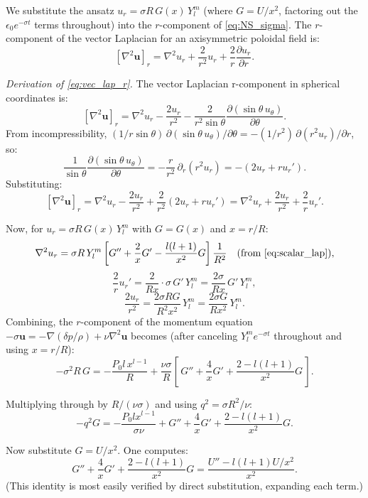 \documentclass[12pt]{article}
\newcommand{\bu}{\bm{u}}
\theoremstyle{definition}
\begin{document}
\begin{derivbox}
We substitute the ansatz $u_r = \sigma R\,G(x)\,Y_l^m$ (where $G = U/x^2$, factoring out
the $\epsilon_0 e^{-\sigma t}$ terms throughout) into the $r$-component of
\eqref{eq:NS_sigma}. The $r$-component of the vector Laplacian for an axisymmetric
poloidal field is:
\begin{equation}
  \left[\nabla^2\bu\right]_r = \nabla^2 u_r + \frac{2}{r^2}u_r + \frac{2}{r}\frac{\partial u_r}{\partial r}.
  \label{eq:vec_lap_r}
\end{equation}

\textit{Derivation of \eqref{eq:vec_lap_r}.}
The vector Laplacian r-component in spherical coordinates is:
\[
  \left[\nabla^2\bu\right]_r = \nabla^2 u_r - \frac{2u_r}{r^2}
    - \frac{2}{r^2\sin\theta}\frac{\partial(\sin\theta\,u_\theta)}{\partial\theta}.
\]
From incompressibility, $(1/r\sin\theta)\,\partial(\sin\theta\,u_\theta)/\partial\theta
= -(1/r^2)\,\partial(r^2 u_r)/\partial r$, so:
\[
  \frac{1}{\sin\theta}\frac{\partial(\sin\theta\,u_\theta)}{\partial\theta}
  = -\frac{r}{r^2}\,\partial_r(r^2 u_r)
  = -(2u_r + r u_r').
\]
Substituting:
\[
  \left[\nabla^2\bu\right]_r 
  = \nabla^2 u_r - \frac{2u_r}{r^2} 
    + \frac{2}{r^2}(2u_r + r u_r')
  = \nabla^2 u_r + \frac{2u_r}{r^2} + \frac{2}{r}u_r'.
\]

Now, for $u_r = \sigma R\,G(x)\,Y_l^m$ with $G = G(x)$ and $x=r/R$:
\[
  \nabla^2 u_r = \sigma R\,Y_l^m\left[G'' + \frac{2}{x}G' - \frac{l(l+1)}{x^2}G\right]\frac{1}{R^2}
\quad\text{(from \eqref{eq:scalar_lap})},
\]
\[
  \frac{2}{r}u_r' = \frac{2}{Rx}\cdot \sigma\,G'\,Y_l^m
  = \frac{2\sigma}{R x}\,G'\,Y_l^m,
\]
\[
  \frac{2u_r}{r^2} = \frac{2\sigma R G}{R^2 x^2}\,Y_l^m = \frac{2\sigma G}{R x^2}\,Y_l^m.
\]
Combining, the $r$-component of the momentum equation $-\sigma\bu = -\nabla(\delta p/\rho) + \nu\nabla^2\bu$ becomes (after canceling $Y_l^m e^{-\sigma t}$ throughout and using $x = r/R$):
\begin{equation}
  -\sigma^2 R\,G = -\frac{P_0 l\,x^{l-1}}{R} + \frac{\nu\sigma}{R}\left[\,G'' + \frac{4}{x}G' + \frac{2 - l(l+1)}{x^2}G\,\right].
  \label{eq:r_comp_mom}
\end{equation}

Multiplying through by $R/(\nu\sigma)$ and using $q^2 = \sigma R^2/\nu$:
\[
  -q^2 G = -\frac{P_0 l x^{l-1}}{\sigma\nu} + G'' + \frac{4}{x}G' + \frac{2-l(l+1)}{x^2}G.
\]

Now substitute $G = U/x^2$. One computes:
\[
  G'' + \frac{4}{x}G' + \frac{2-l(l+1)}{x^2}G 
  = \frac{U'' - l(l+1)U/x^2}{x^2}.
\]
(This identity is most easily verified by direct substitution, expanding each term.)


\end{derivbox}
\end{document}
